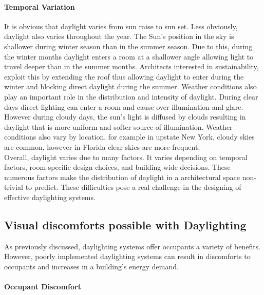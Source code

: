     \paragraph{Temporal Variation} 

    It is obvious that daylight varies from sun raise to sun set.
    Less obviously, daylight also varies throughout the year.
    The Sun's position in the sky is shallower during winter season than in the summer season. 
    Due to this, during the winter months daylight enters a room at a shallower angle allowing light to travel deeper than in the summer months.
    Architects interested in sustainability, exploit this by extending the roof thus allowing daylight to enter during the winter and blocking direct daylight during the summer.
    Weather conditions also play an important role in the distribution and intensity of daylight. 
    During clear days direct lighting can enter a room and cause over illumination and glare.
    However during cloudy days, the sun's light is diffused by clouds resulting in daylight that is more uniform and softer source of illumination.
    Weather conditions also vary by location, for example in upstate New York, cloudy skies are common, however in Florida clear skies are more frequent.\\

    Overall, daylight varies due to many factors. It varies depending on temporal factors, room-specific design choices, and building-wide decisions. These numerous factors make the distribution of daylight in a architectural space non-trivial to predict. 
    These difficulties pose a real challenge in the designing of effective daylighting systems.

  \subsection{Visual discomforts possible with Daylighting}

    As previously discussed, daylighting systems offer occupants a variety of benefits.
    However, poorly implemented daylighting systems can result in discomforts to occupants and increases in a building's energy demand. 

    \paragraph{Occupant Discomfort}

